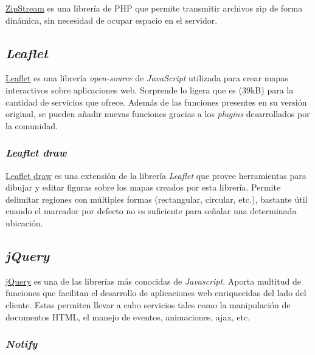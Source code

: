 \documentclass[
]{article}
\begin{document}
\href{https://github.com/maennchen/ZipStream-PHP/tree/0.2.2}{ZipStream}
es una librería de PHP que permite transmitir archivos zip de forma
dinámica, sin necesidad de ocupar espacio en el servidor.

\hypertarget{leaflet}{%
\subsection{\texorpdfstring{\emph{Leaflet}}{Leaflet}}\label{leaflet}}

\href{https://github.com/Leaflet/Leaflet}{Leaflet} es una librería
\emph{open-source} de \emph{JavaScript} utilizada para crear mapas
interactivos sobre aplicaciones web. Sorprende lo ligera que es (39kB)
para la cantidad de servicios que ofrece. Además de las funciones
presentes en su versión original, se pueden añadir nuevas funciones
gracias a los \emph{plugins} desarrollados por la comunidad.

\hypertarget{leaflet-draw}{%
\subsubsection{\texorpdfstring{\emph{Leaflet
draw}}{Leaflet draw}}\label{leaflet-draw}}

\href{https://github.com/Leaflet/Leaflet.draw}{Leaflet draw} es una
extensión de la librería \emph{Leaflet} que provee herramientas para
dibujar y editar figuras sobre los mapas creados por esta librería.
Permite delimitar regiones con múltiples formas (rectangular, circular,
etc.), bastante útil cuando el marcador por defecto no es suficiente
para señalar una determinada ubicación.

\hypertarget{jquery}{%
\subsection{\texorpdfstring{\emph{jQuery}}{jQuery}}\label{jquery}}

\href{https://jquery.com/}{jQuery} es una de las librerías más conocidas
de \emph{Javascript}. Aporta multitud de funciones que facilitan el
desarrollo de aplicaciones web enriquecidas del lado del cliente. Estas
permiten llevar a cabo servicios tales como la manipulación de
documentos HTML, el manejo de eventos, animaciones, ajax, etc.

\hypertarget{notify}{%
\subsubsection{\texorpdfstring{\emph{Notify}}{Notify}}\label{notify}}
\end{document}
